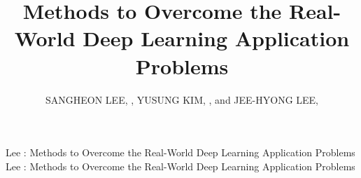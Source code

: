 \documentclass{ieeeaccess}
\begin{document}
\doi{}

\title{Methods to Overcome the Real-World Deep Learning Application Problems}
\author{
	\uppercase{Sangheon Lee}, ,
	\uppercase{Yusung Kim}, , and
	\uppercase{Jee-Hyong Lee}, }
	
\address[1]{Department of Electrical and Computer Engineering, Sungkyunkwan University, Suwon 16419, Korea (e-mail: lawlee1@skku.edu)}
\address[2]{Memory Business, Samsung Electronics, Hwaseong 18448, Korea (e-mail: yusunge.kim@samsung.com)}
\address[3]{Department of Software, Sungkyunkwan University, Suwon 16419, Korea (e-mail: john@skku.edu)}

\tfootnote{}

\markboth
{Lee \headeretal: Methods to Overcome the Real-World Deep Learning Application Problems}
{Lee \headeretal: Methods to Overcome the Real-World Deep Learning Application Problems}

\end{document}
